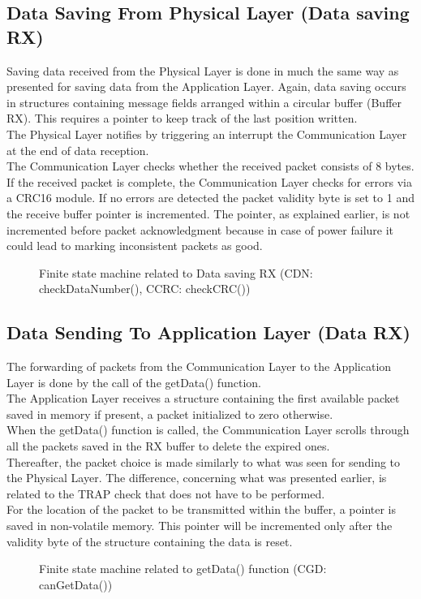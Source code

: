 \subsection{Data Saving From Physical Layer (Data saving RX)}
\label{sec:CommLayer3}
Saving data received from the Physical Layer is done in much the same way as presented for saving data from the Application Layer. Again, data saving occurs in structures containing message fields arranged within a circular buffer (Buffer RX). This requires a pointer to keep track of the last position written.\\
The Physical Layer notifies by triggering an interrupt the Communication Layer at the end of data reception.\\
The Communication Layer checks whether the received packet consists of 8 bytes. If the received packet is complete, the Communication Layer checks for errors via a CRC16 module. If no errors are detected the packet validity byte is set to 1 and the receive buffer pointer is incremented. The pointer, as explained earlier, is not incremented before packet acknowledgment because in case of power failure it could lead to marking inconsistent packets as good.
\begin{figure}[H]
\centerline{}
\caption{\footnotesize \centering Finite state machine related to Data saving RX (CDN: checkDataNumber(), CCRC: checkCRC())}
\label{fig:FSMSAVERX}
\end{figure}
\subsection{Data Sending To Application Layer (Data RX)}
\label{sec:CommLayer4}
The forwarding of packets from the Communication Layer to the Application Layer is done by the call of the getData() function.\\
The Application Layer receives a structure containing the first available packet saved in memory if present, a packet initialized to zero otherwise.\\
When the getData() function is called, the Communication Layer scrolls through all the packets saved in the RX buffer to delete the expired ones.\\
Thereafter, the packet choice is made similarly to what was seen for sending to the Physical Layer. The difference, concerning what was presented earlier, is related to the TRAP check that does not have to be performed.\\
For the location of the packet to be transmitted within the buffer, a pointer is saved in non-volatile memory. This pointer will be incremented only after the validity byte of the structure containing the data is reset.
\begin{figure}[H]
\centerline{}
\caption{\footnotesize \centering Finite state machine related to getData() function (CGD: canGetData())}
\label{fig:DATAGET}
\end{figure}

